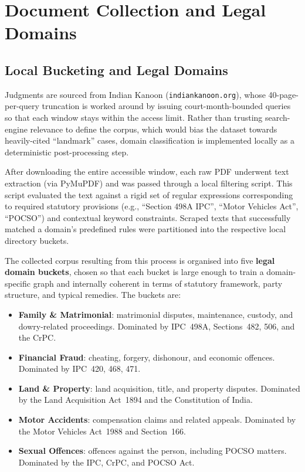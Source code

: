 \section{Document Collection and Legal Domains}

\subsection{Local Bucketing and Legal Domains}

Judgments are sourced from Indian Kanoon (\texttt{indiankanoon.org}),
whose 40-page-per-query truncation is worked around by issuing
court-month-bounded queries so that each window stays within the
access limit. Rather than trusting search-engine relevance to define
the corpus, which would bias the dataset towards heavily-cited
``landmark'' cases, domain classification is implemented locally as a
deterministic post-processing step.

After downloading the entire accessible window, each raw PDF underwent text extraction (via PyMuPDF) and was passed through a local filtering script. This script evaluated the text against a rigid set of regular expressions corresponding to required statutory provisions (e.g., ``Section 498A IPC'', ``Motor Vehicles Act'', ``POCSO'') and contextual keyword constraints. Scraped texts that successfully matched a domain's predefined rules were partitioned into the respective local directory buckets.

The collected corpus resulting from this process is organised into five \textbf{legal domain buckets}, chosen so that each bucket is large enough to train a domain-specific graph and internally coherent in terms of statutory framework, party structure, and typical remedies. The buckets are:

\begin{itemize}
  \item \textbf{Family \& Matrimonial}:
    matrimonial disputes, maintenance, custody, and dowry-related
    proceedings. Dominated by IPC~498A, Sections~482, 506, and the CrPC.
  \item \textbf{Financial Fraud}:
    cheating, forgery, dishonour, and economic offences. Dominated by
    IPC~420, 468, 471.
  \item \textbf{Land \& Property}:
    land acquisition, title, and property disputes. Dominated by the
    Land Acquisition Act~1894 and the Constitution of India.
  \item \textbf{Motor Accidents}:
    compensation claims and related appeals. Dominated by the Motor
    Vehicles Act~1988 and Section~166.
  \item \textbf{Sexual Offences}:
    offences against the person, including POCSO matters. Dominated by
    the IPC, CrPC, and POCSO Act.
\end{itemize}

